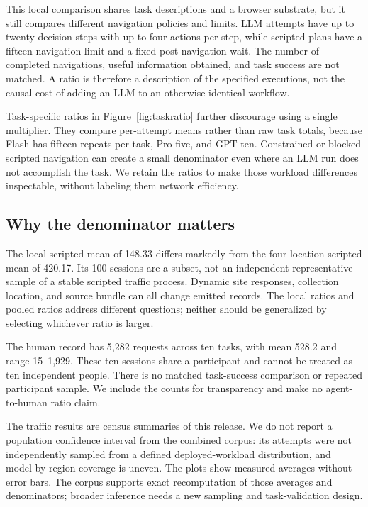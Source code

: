 \documentclass[10pt,sigconf,nonacm]{acmart}
\begin{document}
This local comparison shares task descriptions and a browser substrate, but it still compares different navigation policies and limits. LLM attempts have up to twenty decision steps with up to four actions per step, while scripted plans have a fifteen-navigation limit and a fixed post-navigation wait. The number of completed navigations, useful information obtained, and task success are not matched. A ratio is therefore a description of the specified executions, not the causal cost of adding an LLM to an otherwise identical workflow.

Task-specific ratios in Figure~\ref{fig:taskratio} further discourage using a single multiplier. They compare per-attempt means rather than raw task totals, because Flash has fifteen repeats per task, Pro five, and GPT ten. Constrained or blocked scripted navigation can create a small denominator even where an LLM run does not accomplish the task. We retain the ratios to make those workload differences inspectable, without labeling them network efficiency.

\subsection{Why the denominator matters}
The local scripted mean of 148.33 differs markedly from the four-location scripted mean of 420.17. Its 100 sessions are a subset, not an independent representative sample of a stable scripted traffic process. Dynamic site responses, collection location, and source bundle can all change emitted records. The local ratios and pooled ratios address different questions; neither should be generalized by selecting whichever ratio is larger.

The human record has 5{,}282 requests across ten tasks, with mean 528.2 and range 15--1{,}929. These ten sessions share a participant and cannot be treated as ten independent people. There is no matched task-success comparison or repeated participant sample. We include the counts for transparency and make no agent-to-human ratio claim.

The traffic results are census summaries of this release. We do not report a population confidence interval from the combined corpus: its attempts were not independently sampled from a defined deployed-workload distribution, and model-by-region coverage is uneven. The plots show measured averages without error bars. The corpus supports exact recomputation of those averages and denominators; broader inference needs a new sampling and task-validation design.
\end{document}
